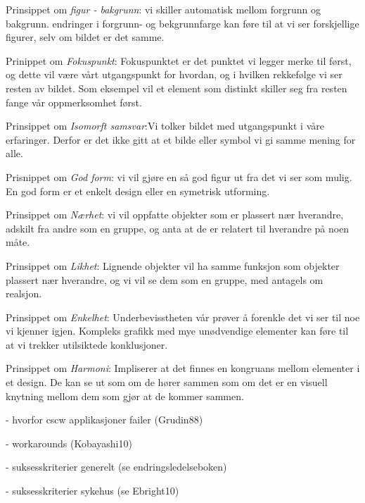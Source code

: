 \noindent
Prinsippet om \emph{figur - bakgrunn}: vi skiller automatisk mellom forgrunn og bakgrunn. endringer i forgrunn- og bekgrunnfarge kan føre til at vi ser forskjellige figurer, selv om bildet er det samme.

\noindent
Prinippet om \emph{Fokuspunkt}: Fokuspunktet er det punktet vi legger merke til først, og dette vil være vårt utgangspunkt for hvordan, og i hvilken rekkefølge vi ser resten av bildet. Som eksempel vil et element som distinkt skiller seg fra resten fange vår oppmerksomhet først.

\noindent
Prinsippet om \emph{Isomorft samsvar}:Vi tolker bildet med utgangspunkt i våre erfaringer. Derfor er det ikke gitt at et bilde eller symbol vi gi samme mening for alle.

\noindent
Prisnippet om \emph{God form}: vi vil gjøre en så god figur ut fra det vi ser som mulig. En god form er et enkelt design eller en symetrisk utforming.

\noindent
Prinsippet om \emph{Nærhet}: vi vil oppfatte objekter som er plassert nær hverandre, adskilt fra andre som en gruppe, og anta at de er relatert til hverandre på noen måte.

\noindent
Prinsippet om \emph{Likhet}: Lignende objekter vil ha samme funksjon som objekter plassert nær hverandre, og vi vil se dem som en gruppe, med antagels om realsjon.

\noindent
Prinsippet om \emph{Enkelhet}: Underbevisstheten vår prøver å forenkle det vi ser til noe vi kjenner igjen. Kompleks grafikk med mye unødvendige elementer kan føre til at vi trekker utilsiktede konklusjoner.

\noindent
Prinsippet om \emph{Harmoni}: Impliserer at det finnes en kongruans mellom elementer i et design. De kan se ut som om de hører sammen som om det er en visuell knytning mellom dem som gjør at de kommer sammen.


- hvorfor cscw applikasjoner failer (Grudin88)

- workarounds (Kobayashi10)

- suksesskriterier generelt (se endringsledelseboken)

- suksesskriterier sykehus (se Ebright10)

\noindent



